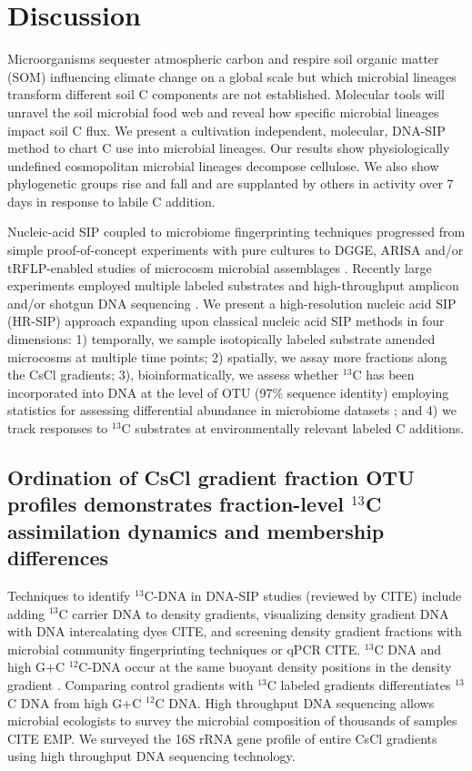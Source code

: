 \section{Discussion}
Microorganisms sequester atmospheric carbon and respire soil organic
matter (SOM) influencing climate change on a global scale but which
microbial lineages transform different soil C components are not
established. Molecular tools will unravel the soil microbial food web and
reveal how specific microbial lineages impact soil C flux. We present
a cultivation independent, molecular, DNA-SIP method to chart C use into
microbial lineages. Our results show physiologically undefined
cosmopolitan microbial lineages decompose cellulose. We also show
phylogenetic groups rise and fall and are supplanted by others in activity
over 7 days in response to labile C addition.  

Nucleic-acid SIP coupled to microbiome fingerprinting techniques
progressed from simple proof-of-concept experiments with pure cultures
\citep{radajewski2000stable} to DGGE, ARISA and/or tRFLP-enabled studies
of microcosm microbial assemblages \citep{Haichar_2007}. Recently large
experiments employed multiple labeled substrates and high-throughput
amplicon and/or shotgun DNA sequencing \citep{Verastegui_2014}. We present
a high-resolution nucleic acid SIP (HR-SIP) approach expanding upon
classical nucleic acid SIP methods in four dimensions: 1) temporally, we
sample isotopically labeled substrate amended microcosms at multiple time
points; 2) spatially, we assay more fractions along the CsCl gradients;
3), bioinformatically, we assess whether $^{13}$C has been incorporated
into DNA at the level of OTU (97\% sequence identity) employing
statistics for assessing differential abundance in microbiome datasets
\citep{McMurdie2014}; and 4) we track responses to $^{13}$C substrates at
environmentally relevant labeled C additions.

\subsection{Ordination of CsCl gradient fraction OTU profiles demonstrates
fraction-level $^{13}$C assimilation dynamics and membership differences}
Techniques to identify $^{13}$C-DNA in DNA-SIP studies (reviewed by CITE)
include adding $^{13}$C carrier DNA to density gradients, visualizing
density gradient DNA with DNA intercalating dyes CITE, and screening
density gradient fractions with microbial community fingerprinting
techniques or qPCR CITE. $^{13}$C DNA and high G+C $^{12}$C-DNA occur at
the same buoyant density positions in the density gradient
\citep{Buckley_2007}. Comparing control gradients with $^{13}$C labeled
gradients differentiates $^{13}$C DNA from high G+C $^{12}$C DNA. High
throughput DNA sequencing allows microbial ecologists to survey the
microbial composition of thousands of samples CITE EMP. We surveyed the
16S rRNA gene profile of entire CsCl gradients using high throughput DNA
sequencing technology.

